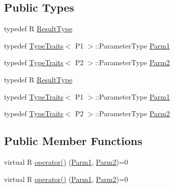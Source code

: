\subsection*{Public Types}
\begin{DoxyCompactItemize}
\item 
typedef R \mbox{\hyperlink{classUtil_1_1FunctorImpl_3_01R_00_01TYPELIST__2_07P1_00_01P2_08_4_a8ab08e094f480f249310bded4d609837}{Result\+Type}}
\item 
typedef \mbox{\hyperlink{classUtil_1_1TypeTraits}{Type\+Traits}}$<$ P1 $>$\+::Parameter\+Type \mbox{\hyperlink{classUtil_1_1FunctorImpl_3_01R_00_01TYPELIST__2_07P1_00_01P2_08_4_a74b37eda530bf33969c4a0eadc2596a5}{Parm1}}
\item 
typedef \mbox{\hyperlink{classUtil_1_1TypeTraits}{Type\+Traits}}$<$ P2 $>$\+::Parameter\+Type \mbox{\hyperlink{classUtil_1_1FunctorImpl_3_01R_00_01TYPELIST__2_07P1_00_01P2_08_4_a9df4ce5861151ea2ca3416ee19140d5f}{Parm2}}
\item 
typedef R \mbox{\hyperlink{classUtil_1_1FunctorImpl_3_01R_00_01TYPELIST__2_07P1_00_01P2_08_4_a8ab08e094f480f249310bded4d609837}{Result\+Type}}
\item 
typedef \mbox{\hyperlink{classUtil_1_1TypeTraits}{Type\+Traits}}$<$ P1 $>$\+::Parameter\+Type \mbox{\hyperlink{classUtil_1_1FunctorImpl_3_01R_00_01TYPELIST__2_07P1_00_01P2_08_4_a74b37eda530bf33969c4a0eadc2596a5}{Parm1}}
\item 
typedef \mbox{\hyperlink{classUtil_1_1TypeTraits}{Type\+Traits}}$<$ P2 $>$\+::Parameter\+Type \mbox{\hyperlink{classUtil_1_1FunctorImpl_3_01R_00_01TYPELIST__2_07P1_00_01P2_08_4_a9df4ce5861151ea2ca3416ee19140d5f}{Parm2}}
\end{DoxyCompactItemize}
\subsection*{Public Member Functions}
\begin{DoxyCompactItemize}
\item 
virtual R \mbox{\hyperlink{classUtil_1_1FunctorImpl_3_01R_00_01TYPELIST__2_07P1_00_01P2_08_4_a5c9378116c2036cb377d239c8d454375}{operator()}} (\mbox{\hyperlink{structUtil_1_1Private_1_1FunctorImplBase_a9d61e693d6c616dea5bd9d9073c7d21a}{Parm1}}, \mbox{\hyperlink{structUtil_1_1Private_1_1FunctorImplBase_a554085cd798ef14838a59b528f0feb2e}{Parm2}})=0
\item 
virtual R \mbox{\hyperlink{classUtil_1_1FunctorImpl_3_01R_00_01TYPELIST__2_07P1_00_01P2_08_4_a5c9378116c2036cb377d239c8d454375}{operator()}} (\mbox{\hyperlink{structUtil_1_1Private_1_1FunctorImplBase_a9d61e693d6c616dea5bd9d9073c7d21a}{Parm1}}, \mbox{\hyperlink{structUtil_1_1Private_1_1FunctorImplBase_a554085cd798ef14838a59b528f0feb2e}{Parm2}})=0
\end{DoxyCompactItemize}
